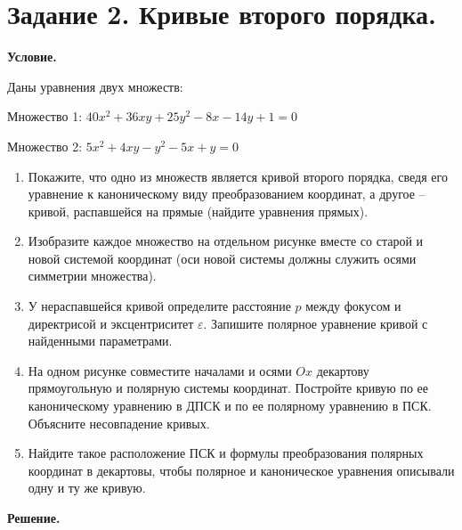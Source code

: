 \section{Задание 2. Кривые второго порядка.}

\textbf{Условие.}

Даны уравнения двух множеств:

Множество 1: $40x^2 + 36xy + 25y^2 - 8x - 14y + 1 = 0$

Множество 2: $5x^2 + 4xy - y^2 - 5x + y = 0$

\begin{enumerate}
    \item Покажите, что одно из множеств является кривой второго порядка, сведя его
    уравнение к каноническому виду преобразованием координат, а другое – кривой,
    распавшейся на прямые (найдите уравнения прямых).
    \item Изобразите каждое множество на отдельном рисунке вместе со старой и новой
    системой координат (оси новой системы должны служить осями симметрии
    множества).
    \item У нераспавшейся кривой определите расстояние $p$ между фокусом и директрисой и
    эксцентриситет $\varepsilon$. Запишите полярное уравнение кривой с найденными параметрами.
    \item На одном рисунке совместите началами и осями $Ox$ декартову прямоугольную и
    полярную системы координат. Постройте кривую по ее каноническому уравнению в
    ДПСК и по ее полярному уравнению в ПСК. Объясните несовпадение кривых.
    \item Найдите такое расположение ПСК и формулы преобразования полярных координат в
    декартовы, чтобы полярное и каноническое уравнения описывали одну и ту же
    кривую.
\end{enumerate}
\vspace{10mm}
\textbf{Решение.}
